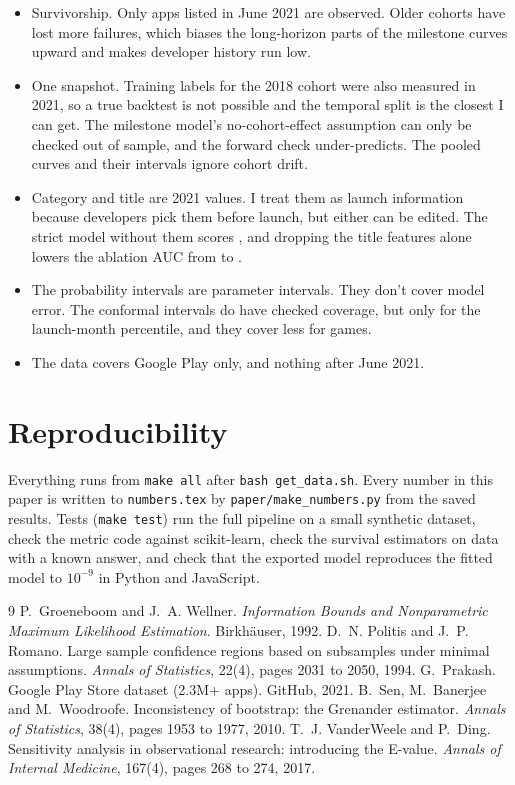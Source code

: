 \documentclass[11pt]{article}
\begin{document}
\begin{itemize}
\item Survivorship. Only apps listed in June 2021 are observed. Older cohorts have lost more failures, which biases
the long-horizon parts of the milestone curves upward and makes developer history run low.
\item One snapshot. Training labels for the 2018 cohort were also measured in 2021, so a true backtest is not possible
and the temporal split is the closest I can get. The milestone model's no-cohort-effect assumption can only be checked out of sample, and the forward
check under-predicts. The pooled curves and their intervals ignore cohort drift.
\item Category and title are 2021 values. I treat them as launch information because developers pick them before
launch, but either can be edited. The strict model without them scores \AUCStrict{}, and dropping the title features alone
lowers the ablation AUC from \AblLaunch{} to \AblNoTitle{}.
\item The probability intervals are parameter intervals. They don't cover model error. The conformal intervals do
have checked coverage, but only for the launch-month percentile, and they cover less for games.
\item The data covers Google Play only, and nothing after June 2021.
\end{itemize}

\section{Reproducibility}

Everything runs from \texttt{make all} after \texttt{bash get\_data.sh}. Every number in this paper is written to
\texttt{numbers.tex} by \texttt{paper/make\_numbers.py} from the saved results. Tests (\texttt{make test}) run the full
pipeline on a small synthetic dataset, check the metric code against scikit-learn, check the survival estimators on
data with a known answer, and check that the exported model reproduces the fitted model to $10^{-9}$ in Python and
JavaScript.


\begin{thebibliography}{9}
P.~Groeneboom and J.~A. Wellner. \emph{Information Bounds and Nonparametric Maximum Likelihood Estimation}.
Birkh\"auser, 1992.
D.~N. Politis and J.~P. Romano. Large sample confidence regions based on subsamples under minimal assumptions.
\emph{Annals of Statistics}, 22(4), pages 2031 to 2050, 1994.
G.~Prakash. Google Play Store dataset (2.3M+ apps). GitHub, 2021.
B.~Sen, M.~Banerjee and M.~Woodroofe. Inconsistency of bootstrap: the Grenander estimator. \emph{Annals of
Statistics}, 38(4), pages 1953 to 1977, 2010.
T.~J. VanderWeele and P.~Ding. Sensitivity analysis in observational research: introducing the E-value.
\emph{Annals of Internal Medicine}, 167(4), pages 268 to 274, 2017.
\end{thebibliography}
\end{document}
